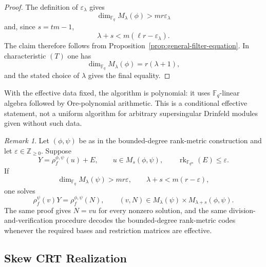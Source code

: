 \documentclass[10pt,a4paper]{amsart}
\DeclareMathOperator{\rk}{rk}
\theoremstyle{definition}
\theoremstyle{plain}
\theoremstyle{remark}
\newtheorem{remark}[definition]{Remark}
\newcommand{\vF}{\mathbb F}
\renewcommand{\epsilon}{\varepsilon}
\begin{document}
\begin{proof}
The definition of $\epsilon_\lambda$ gives
$$
\dim_{\vF_q}M_\lambda(\phi)>mr\epsilon_\lambda
$$
and, since $s=tm-1$,
$$
\lambda+s<m(\ell r-\epsilon_\lambda).
$$
The claim therefore follows from
Proposition~\ref{prop:general-filter-equation}. In characteristic $(T)$ one
has
$$
\dim_{\vF_q}M_\lambda(\phi)=r(\lambda+1),
$$
and the stated choice of $\lambda$ gives the final equality.
\end{proof}
 With the effective data fixed, the algorithm is polynomial:
it uses $\vF_q$-linear algebra followed by Ore-polynomial arithmetic. This is
a conditional effective statement, not a uniform algorithm for arbitrary
supersingular Drinfeld modules given without such data.

\begin{remark}
Let $(\phi,\psi)$ be as in the bounded-degree rank-metric construction and
let $\epsilon\in\mathbb Z_{\geq 0}$. Suppose
$$
Y=\rho_f^{\phi,\psi}(u)+E,
\qquad
u\in M_s(\phi,\psi),
\qquad
\rk_{\vF_{q^m}}(E)\leq\epsilon.
$$
If
$$
\dim_{\vF_q}M_\lambda(\psi)>mr\epsilon,
\qquad
\lambda+s<m(r-\epsilon),
$$
one solves
$$
\rho_f^\psi(v)Y=\rho_f^{\phi,\psi}(N),
\qquad
(v,N)\in M_\lambda(\psi)\times M_{\lambda+s}(\phi,\psi).
$$
The same proof gives $N=vu$ for every nonzero solution, and the same
division-and-verification procedure decodes the bounded-degree rank-metric
codes whenever the required bases and restriction matrices are effective.
\end{remark}

\subsection{Skew CRT Realization}
\end{document}
